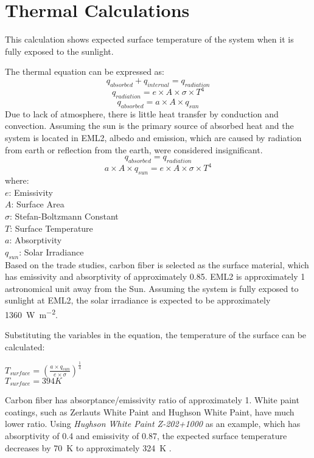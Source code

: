 \section{Thermal Calculations}
\label{app:tempcalc}
\setcounter{equation}{0}
This calculation shows expected surface temperature of the system when it is fully exposed to the sunlight.

The thermal equation can be expressed as:
\begin{equation} 
q_{absorbed}+q_{internal} = q_{radiation}
\end{equation}
\begin{equation} 
q_{radiation}=e\times A\times\sigma \times T^{4}
\end{equation}
\begin{equation} 
q_{absorbed}=a\times A\times q_{sun}
\end{equation}
Due to lack of atmosphere, there is little heat transfer by conduction and convection. Assuming the sun is the primary source of absorbed heat and the system is located in EML2, albedo and emission, which are caused by radiation from earth or reflection from the earth, were considered insignificant.
\begin{equation}
q_{absorbed}=q_{radiation}
\end{equation}
\begin{equation}
a\times A\times q_{sun}=e\times A\times\sigma \times T^{4}
\end{equation}
where: \\
$e$: Emissivity\\
$A$: Surface Area \\
$\sigma$: Stefan-Boltzmann Constant \\
$T$: Surface Temperature \\
$a$: Absorptivity \\
$q_{sun}$: Solar Irradiance \\


Based on the trade studies, carbon fiber is selected as the surface material, which has emissivity and absorptivity of approximately 0.85. EML2 is approximately 1 astronomical unit away from the Sun. Assuming the system is fully exposed to sunlight at EML2, the solar irradiance is expected to be approximately \SI{1360}{\watt\per\square\metre}\cite{IM_solidprop}\cite{GPL_solar}.

Substituting the variables in the equation, the temperature of the surface can be calculated:
\begin{center}
$T_{surface} =(\frac{a\times q_{sun}}{e\times \sigma})^{\frac{1}{4}}$ \\
$T_{surface} = 394 K$
\end{center}
Carbon fiber has absorptance/emissivity ratio of approximately 1. White paint coatings, such as Zerlauts White Paint and Hughson White Paint, have much lower ratio. Using \textit{Hughson White Paint Z-202+1000} as an example, which has absorptivity of 0.4 and emissivity of 0.87, the expected surface temperature decreases by \SI{70}{\kelvin} to approximately \SI{324}{\kelvin} \cite{RRE_solar}. 